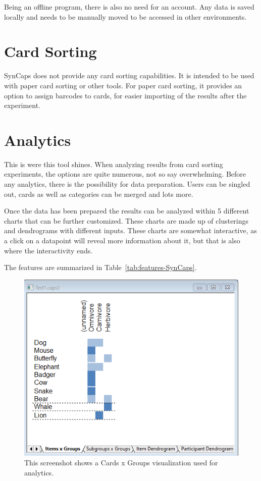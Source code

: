 Being an offline program, there is also no need for an account. Any 
data is saved locally and needs to be manually moved to be accessed in
other environments.

\section{Card Sorting}
SynCaps does not provide any card sorting capabilities. It is intended
to be used with paper card sorting or other tools. For paper card
sorting, it provides an option to assign barcodes to cards, for easier
importing of the results after the experiment.

\section{Analytics}
This is were this tool shines. When analyzing results from card
sorting experiments, the options are quite numerous, not so say
overwhelming. Before any analytics, there is the possibility for
data preparation. Users can be singled out, cards as well as categories
can be merged and lots more.

Once the data has been prepared the results can be analyzed within 5
different charts that can be further customized. These charts are made
up of clusterings and dendrograms with different inputs. These charts
are somewhat interactive, as a click on a datapoint will reveal more
information about it, but that is also where the interactivity ends.

The features are summarized in Table~\ref{tab:features-SynCaps}.

\begin{figure}[tp] 
\centering
\includegraphics[keepaspectratio,width=\linewidth,height=\halfh]{images/syncaps-diagram-1.png}
\caption[SynCaps Clustering] { This screenshot shows a Cards x Groups
visualization used for analytics.
 }
\label{fig:SynCaps2}
\end{figure}

